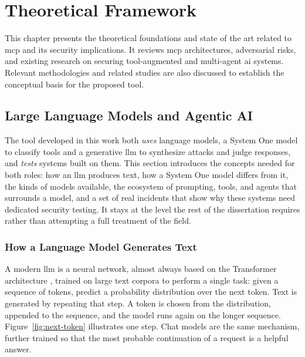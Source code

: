\chapter{Theoretical Framework}
\label{chap:background}

This chapter presents the theoretical foundations and state of the art related to \gls{mcp} and its security implications. It reviews \gls{mcp} architectures, adversarial risks, and existing research on securing tool-augmented and multi-agent \gls{ai} systems. Relevant methodologies and related studies are also discussed to establish the conceptual basis for the proposed tool.   

\section{Large Language Models and Agentic AI}
\label{sec:llm}

The tool developed in this work both \emph{uses} language models, a System One model to classify tools and a generative \gls{llm} to synthesize attacks and judge responses, and \emph{tests} systems built on them. This section introduces the concepts needed for both roles: how an \gls{llm} produces text, how a System One model differs from it, the kinds of models available, the ecosystem of prompting, tools, and agents that surrounds a model, and a set of real incidents that show why these systems need dedicated security testing. It stays at the level the rest of the dissertation requires rather than attempting a full treatment of the field.

\subsection{How a Language Model Generates Text}
\label{sec:llm-predict}

A modern \gls{llm} is a neural network, almost always based on the Transformer architecture \citep{vaswani2017attention}, trained on large text corpora to perform a single task: given a sequence of tokens, predict a probability distribution over the next token. Text is generated by repeating that step. A token is chosen from the distribution, appended to the sequence, and the model runs again on the longer sequence. Figure~\ref{fig:next-token} illustrates one step. Chat models are the same mechanism, further trained so that the most probable continuation of a request is a helpful answer.

